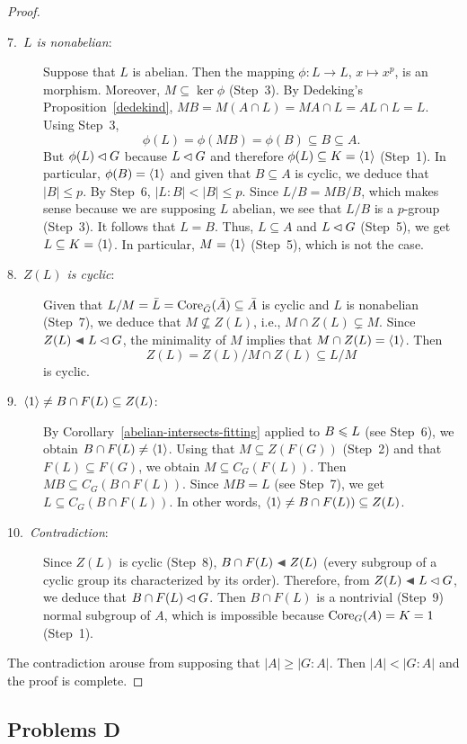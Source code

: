 \begin{proof}
\begin{description}
    \item[\rm7.~\textit{$L$ is nonabelian\/}:] Suppose that $L$ is abelian. Then the mapping $\phi\colon L\to L$, $x\mapsto x^p$, is an morphism. Moreover, $M\subseteq\ker\phi$ (Step~3). By Dedeking's Proposition~\ref{dedekind}, $MB=M(A\cap L)=MA\cap L=AL\cap L= L$. Using Step~3,
    $$
        \phi(L)=\phi(MB)=\phi(B)\subseteq B\subseteq A.
    $$
    But $\phi(L)\lhd G$ because $L\lhd G$ and therefore $\phi(L)\subseteq K=\langle1\rangle$ (Step~1). In particular, $\phi(B)=\langle1\rangle$ and given that $B\subseteq A$ is cyclic, we deduce that $|B|\le p$. By Step~6, $|L:B|<|B|\le p$. Since $L/B=MB/B$, which makes sense because we are supposing $L$ abelian, we see that $L/B$ is a $p$-group (Step~3). It follows that $L=B$. Thus, $L\subseteq A$ and $L\lhd G$ (Step~5), we get $L\subseteq K=\langle1\rangle$. In particular, $M=\langle1\rangle$ (Step~5), which is not the case.

    \item[\rm8.~\textit{$Z(L)$ is cyclic\/}:] Given that $L/M=\bar L={\rm Core}_{\bar G}(\bar A)\subseteq\bar A$ is cyclic and $L$ is nonabelian (Step~7), we deduce that $M\not\subseteq Z(L)$, i.e., $M\cap Z(L)\varsubsetneq M$. Since $Z(L)\ch L\normal G$, the minimality of $M$ implies that $M\cap Z(L)=\langle1\rangle$. Then
    $$
        Z(L)=Z(L)/M\cap Z(L)\subseteq L/M
    $$
    is cyclic.
    
    \item[\rm9.~\textit{$\langle1\rangle\ne B\cap F(L)\subseteq Z(L)$\/}:] By Corollary~\ref{abelian-intersects-fitting} applied to $B\leqslant L$ (see Step~6), we obtain $B\cap F(L)\ne\langle1\rangle$. Using that $M\subseteq Z(F(G))$ (Step~2) and that $F(L)\subseteq F(G)$, we obtain $M\subseteq C_G(F(L))$. Then $MB\subseteq C_G(B\cap F(L))$. Since $MB=L$ (see Step~7), we get $L\subseteq C_G(B\cap F(L))$. In other words, $\langle1\rangle\ne B\cap F(L))\subseteq Z(L)$.

    \item[\rm10.~\textit{Contradiction\/}:] Since $Z(L)$ is cyclic (Step~8), $B\cap F(L)\ch Z(L)$ (every subgroup of a cyclic group its characterized by its order). Therefore, from $Z(L)\ch L\normal G$, we deduce that $B\cap F(L)\lhd G$. Then $B\cap F(L)$ is a nontrivial (Step~9) normal subgroup of $A$, which is impossible because ${\rm Core}_G(A)=K=1$ (Step~1).
\end{description}
The contradiction arouse from supposing that $|A|\ge|G:A|$. Then $|A|<|G:A|$ and the proof is complete.  \end{proof}

\subsection{Problems D}

